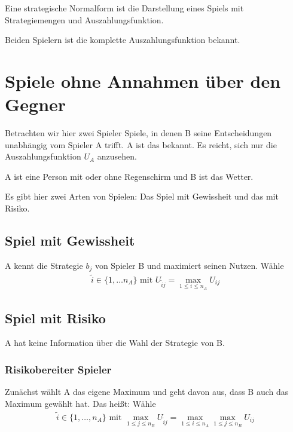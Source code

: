 \begin{defi}
	Eine strategische Normalform ist die Darstellung eines Spiels mit Strategiemengen und Auszahlungsfunktion. 
\end{defi}

\begin{defi}
	Beiden Spielern ist die komplette Auszahlungsfunktion bekannt. 
\end{defi}

\section{Spiele ohne Annahmen über den Gegner}
Betrachten wir hier zwei Spieler Spiele, in denen B seine Entscheidungen unabhängig vom Spieler A trifft. A ist das bekannt. Es reicht, sich nur die Auszahlungsfunktion $U_A$ anzusehen. 
\begin{bsp}
	A ist eine Person mit oder ohne Regenschirm und B ist das Wetter. 
\end{bsp} 
Es gibt hier zwei Arten von Spielen: Das Spiel mit Gewissheit und das mit Risiko. 

\subsection{Spiel mit Gewissheit}
A kennt die Strategie $b_j$ von Spieler B und maximiert seinen Nutzen. Wähle
\begin{align*}
	\tilde{i} \in \{ 1, \dots n_A \} \text{ mit } U_{\tilde{i}j}=\max\limits_{1 \leq i \leq n_A} U_{ij}
\end{align*}

\subsection{Spiel mit Risiko}
A hat keine Information über die Wahl der Strategie von B. 

\subsubsection{Risikobereiter Spieler}
Zunächst wählt A das eigene Maximum und geht davon aus, dass B auch das Maximum gewählt hat. Das heißt: Wähle 
\begin{align*}
	\tilde{i} \in \{1, \dots, n_A  \} \text{ mit } \max\limits_{1 \leq j \leq n_B} U_{\tilde{i}j}=\max\limits_{1 \leq i \leq n_A} \max\limits_{1 \leq j \leq n_B} U_{ij}
\end{align*} 

